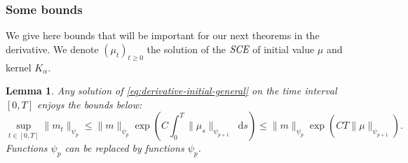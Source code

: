 \documentclass[11pt,a4paper]{article}
\newcommand{\SCE}{\emph{SCE}}
\newcommand{\Proc}[1]{\left(#1\right)_{t\geq 0}}
\newcommand{\dd}{\mathop{}\!\mathrm{d}}
\newtheorem{lemma}[theorem]{Lemma}
\begin{document}
\subsubsection{Some bounds}
We give here bounds that will be important for our next theorems in the derivative. We denote $\Proc{\mu_t}$ the solution of the $\SCE$ of initial value $\mu$ and kernel $K_\alpha$.
\begin{lemma}\label{lem:bound_derivative}
    Any solution of \eqref{eq:derivative-initial-general} on the time interval $[0,T]$ enjoys the bounds below:
    \[ \sup\limits_{t \in [0,T]}\| m_t\|_{\psi_p} \leq \| m\|_{\psi_p} \exp{\left( C\int_0^T\| \mu_s\|_{\psi_{p+1}} \dd s \right)} \leq \| m\|_{\psi_p} \exp{\left( CT\| \mu\|_{\psi_{p+1}}\right)}.\]
    Functions $\psi_p$ can be replaced by functions $\psi_p$.
\end{lemma}
\end{document}
